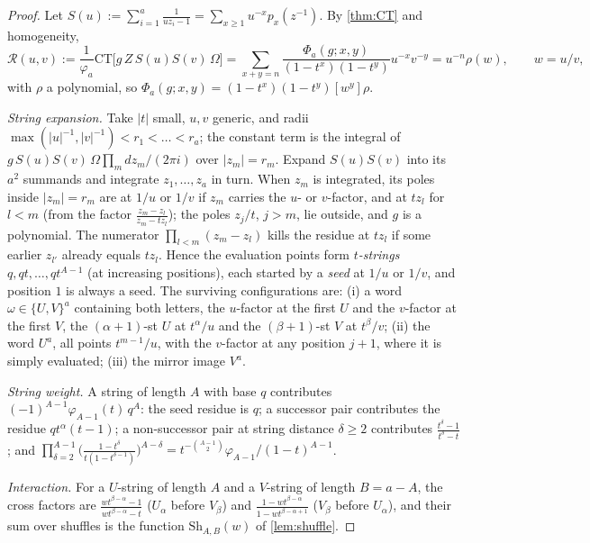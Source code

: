 \documentclass[11pt]{amsart}
\theoremstyle{definition}
\theoremstyle{remark}
\numberwithin{equation}{section}
\begin{document}
\begin{proof}
Let $S(u):=\sum_{i=1}^a\frac{1}{uz_i-1}=\sum_{x\ge1}u^{-x}p_x(z^{-1})$. By \cref{thm:CT} and homogeneity,
\[ \mathcal R(u,v):=\frac1{\varphi_a}\mathrm{CT}\bigl[g\,Z\,S(u)S(v)\,\Omega\bigr]=\sum_{x+y=n}\frac{\Phi_a(g;x,y)}{(1-t^x)(1-t^y)}u^{-x}v^{-y}=u^{-n}\rho(w),\qquad w=u/v, \]
with $\rho$ a polynomial, so $\Phi_a(g;x,y)=(1-t^x)(1-t^y)[w^y]\rho$.

\emph{String expansion.} Take $|t|$ small, $u,v$ generic, and radii $\max(|u|^{-1},|v|^{-1})<r_1<\dots<r_a$; the constant term is the integral of $g\,S(u)S(v)\,\Omega\prod_mdz_m/(2\pi i)$ over $|z_m|=r_m$. Expand $S(u)S(v)$ into its $a^2$ summands and integrate $z_1,\dots,z_a$ in turn. When $z_m$ is integrated, its poles inside $|z_m|=r_m$ are at $1/u$ or $1/v$ if $z_m$ carries the $u$- or $v$-factor, and at $tz_l$ for $l<m$ (from the factor $\frac{z_m-z_l}{z_m-tz_l}$); the poles $z_j/t$, $j>m$, lie outside, and $g$ is a polynomial. The numerator $\prod_{l<m}(z_m-z_l)$ kills the residue at $tz_l$ if some earlier $z_{l'}$ already equals $tz_l$. Hence the evaluation points form \emph{$t$-strings} $q,qt,\dots,qt^{A-1}$ (at increasing positions), each started by a \emph{seed} at $1/u$ or $1/v$, and position $1$ is always a seed. The surviving configurations are: (i) a word $\omega\in\{U,V\}^a$ containing both letters, the $u$-factor at the first $U$ and the $v$-factor at the first $V$, the $(\alpha+1)$-st $U$ at $t^\alpha/u$ and the $(\beta+1)$-st $V$ at $t^\beta/v$; (ii) the word $U^a$, all points $t^{m-1}/u$, with the $v$-factor at any position $j+1$, where it is simply evaluated; (iii) the mirror image $V^a$.

\emph{String weight.} A string of length $A$ with base $q$ contributes $(-1)^{A-1}\varphi_{A-1}(t)\,q^A$: the seed residue is $q$; a successor pair contributes the residue $qt^\alpha(t-1)$; a non-successor pair at string distance $\delta\ge2$ contributes $\frac{t^\delta-1}{t^\delta-t}$; and $\prod_{\delta=2}^{A-1}\bigl(\frac{1-t^\delta}{t(1-t^{\delta-1})}\bigr)^{A-\delta}=t^{-\binom{A-1}2}\varphi_{A-1}/(1-t)^{A-1}$.

\emph{Interaction.} For a $U$-string of length $A$ and a $V$-string of length $B=a-A$, the cross factors are $\frac{wt^{\beta-\alpha}-1}{wt^{\beta-\alpha}-t}$ ($U_\alpha$ before $V_\beta$) and $\frac{1-wt^{\beta-\alpha}}{1-wt^{\beta-\alpha+1}}$ ($V_\beta$ before $U_\alpha$), and their sum over shuffles is the function $\mathrm{Sh}_{A,B}(w)$ of \cref{lem:shuffle}.


\end{proof}
\end{document}
